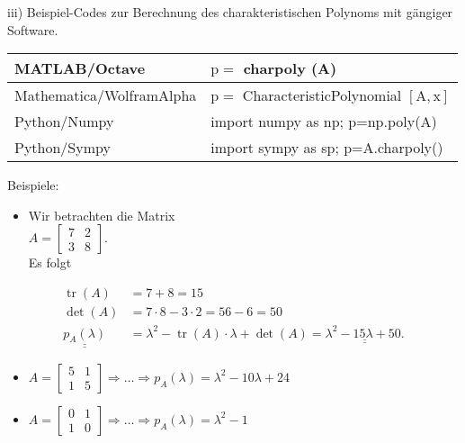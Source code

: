 \documentclass[10pt]{article}
\begin{document}
iii) Beispiel-Codes zur Berechnung des charakteristischen Polynoms mit gängiger Software.

\begin{center}
\begin{tabular}{|l|l|}
\hline
MATLAB/Octave & $\mathrm{p}=$ charpoly (A) \\
\hline
Mathematica/WolframAlpha & $\mathrm{p}=$ CharacteristicPolynomial $[\mathrm{A}, \mathrm{x}]$ \\
\hline
Python/Numpy & import numpy as np; p=np.poly(A) \\
\hline
Python/Sympy & import sympy as sp; p=A.charpoly() \\
\hline
\end{tabular}
\end{center}

Beispiele:

\begin{itemize}
  \item Wir betrachten die Matrix\\
$A=\left[\begin{array}{ll}7 & 2 \\ 3 & 8\end{array}\right]$.\\
Es folgt
\end{itemize}


\begin{align*}
\operatorname{tr}(A) & =7+8=15  \tag{6.164}\\
\operatorname{det}(A) & =7 \cdot 8-3 \cdot 2=56-6=50  \tag{6.165}\\
\underline{\underline{p_{A}(\lambda)}} & =\lambda^{2}-\operatorname{tr}(A) \cdot \lambda+\operatorname{det}(A)=\underline{\underline{\lambda^{2}-15 \lambda+50 .}} \tag{6.166}
\end{align*}


\begin{itemize}
  \item $A=\left[\begin{array}{ll}5 & 1 \\ 1 & 5\end{array}\right] \Rightarrow \ldots \Rightarrow p_{A}(\lambda)=\lambda^{2}-10 \lambda+24$
  \item $A=\left[\begin{array}{ll}0 & 1 \\ 1 & 0\end{array}\right] \Rightarrow \ldots \Rightarrow p_{A}(\lambda)=\lambda^{2}-1$
\end{itemize}
\end{document}
